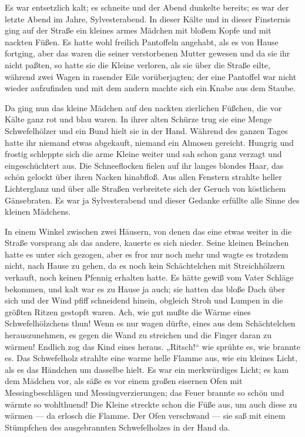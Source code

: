 \documentclass{scrartcl}
\begin{document}
\noindent Es war entsetzlich kalt; es schneite und der Abend dunkelte bereits; es war der letzte Abend im Jahre, Sylvesterabend. In dieser Kälte und in dieser Finsternis ging auf der Straße ein kleines armes Mädchen mit bloßem Kopfe und mit nackten Füßen. Es hatte wohl freilich Pantoffeln angehabt, als es von Hause fortging, aber das waren die seiner verstorbenen Mutter gewesen und da sie ihr nicht paßten, so hatte sie die Kleine verloren, als sie über die Straße eilte, während zwei Wagen in rasender Eile vorüberjagten; der eine Pantoffel war nicht wieder aufzufinden und mit dem andern machte sich ein Knabe aus dem Staube.

Da ging nun das kleine Mädchen auf den nackten zierlichen Füßchen, die vor Kälte ganz rot und blau waren. In ihrer alten Schürze trug sie eine Menge Schwefelhölzer und ein Bund hielt sie in der Hand. Während des ganzen Tages hatte ihr niemand etwas abgekauft, niemand ein Almosen gereicht. Hungrig und frostig schleppte sich die arme Kleine weiter und sah schon ganz verzagt und eingeschüchtert aus. Die Schneeflocken fielen auf ihr langes blondes Haar, das schön gelockt über ihren Nacken hinabfloß. Aus allen Fenstern strahlte heller Lichterglanz und über alle Straßen verbreitete sich der Geruch von köstlichem Gänsebraten. Es war ja Sylvesterabend und dieser Gedanke erfüllte alle Sinne des kleinen Mädchens.

In einem Winkel zwischen zwei Häusern, von denen das eine etwas weiter in die Straße vorsprang als das andere, kauerte es sich nieder. Seine kleinen Beinchen hatte es unter sich gezogen, aber es fror nur noch mehr und wagte es trotzdem nicht, nach Hause zu gehen, da es noch kein Schächtelchen mit Streichhölzern verkauft, noch keinen Pfennig erhalten hatte. Es hätte gewiß vom Vater Schläge bekommen, und kalt war es zu Hause ja auch; sie hatten das bloße Dach über sich und der Wind pfiff schneidend hinein, obgleich Stroh und Lumpen in die größten Ritzen gestopft waren. Ach, wie gut mußte die Wärme eines Schwefelhölzchens thun! Wenn es nur wagen dürfte, eines aus dem Schächtelchen herauszunehmen, es gegen die Wand zu streichen und die Finger daran zu wärmen! Endlich zog das Kind eines heraus. „Ritsch!“ wie sprühte es, wie brannte es. Das Schwefelholz strahlte eine warme helle Flamme aus, wie ein kleines Licht, als es das Händchen um dasselbe hielt. Es war ein merkwürdiges Licht; es kam dem Mädchen vor, als säße es vor einem großen eisernen Ofen mit Messingbeschlägen und Messingverzierungen; das Feuer brannte so schön und wärmte so wohlthuend! Die Kleine streckte schon die Füße aus, um auch diese zu wärmen — da erlosch die Flamme. Der Ofen verschwand — sie saß mit einem Stümpfchen des ausgebrannten Schwefelholzes in der Hand da.
\end{document}
